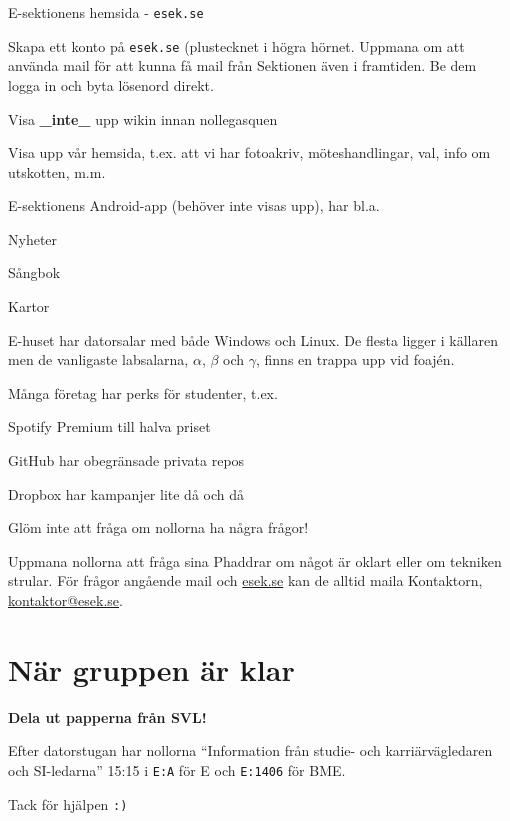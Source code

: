 \documentclass[10pt]{article}
\begin{document}
\begin{dashlist}
        \newpage

        \item E-sektionens hemsida - \texttt{esek.se}
        \begin{dashlist}
            \item Skapa ett konto på \texttt{esek.se} (plustecknet i högra hörnet. Uppmana om att använda mail för att kunna få mail från Sektionen även i framtiden. Be dem logga in och byta lösenord direkt.
            \item Visa \textbf{\_inte\_} upp wikin innan nollegasquen
            \item Visa upp vår hemsida, t.ex. att vi har fotoakriv, möteshandlingar, val, info om utskotten, m.m.
        \end{dashlist}

        \item E-sektionens Android-app (behöver inte visas upp), har bl.a.
        \begin{dashlist}
            \item Nyheter
            \item Sångbok
            \item Kartor
        \end{dashlist}

        \item E-huset har datorsalar med både Windows och Linux. De flesta ligger i källaren men de vanligaste labsalarna, $\alpha$, $\beta$ och $\gamma$, finns en trappa upp vid foajén.

        \item Många företag har perks för studenter, t.ex.
        \begin{dashlist}
            \item Spotify Premium till halva priset
            \item GitHub har obegränsade privata repos
            \item Dropbox har kampanjer lite då och då
        \end{dashlist}

        \item Glöm inte att fråga om nollorna ha några frågor!

        \item Uppmana nollorna att fråga sina Phaddrar om något är oklart eller om tekniken strular. För frågor angående mail och \url{esek.se} kan de alltid maila Kontaktorn, \url{kontaktor@esek.se}.
    \end{dashlist}

    \section{När gruppen är klar}

    \textbf{Dela ut papperna från SVL!}

    Efter datorstugan har nollorna ``Information från studie- och karriärvägledaren och SI-ledarna'' 15:15 i \texttt{E:A} för E och \texttt{E:1406} för BME.

    Tack för hjälpen \texttt{:)}
\end{document}
